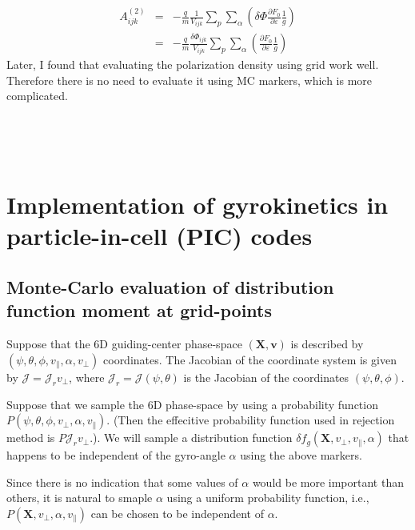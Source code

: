 \documentclass{article}
\begin{document}
\begin{eqnarray*}
  A_{i j k}^{(2)} & = & - \frac{q}{m} \frac{1}{V_{i j k}} \sum_p \sum_{\alpha}
  \left( \delta \Phi \frac{\partial F_0}{\partial \varepsilon} \frac{1}{g}
  \right)\\
  & = & - \frac{q}{m} \frac{\delta \Phi_{i j k}}{V_{i j k}} \sum_p
  \sum_{\alpha} \left( \frac{\partial F_0}{\partial \varepsilon} \frac{1}{g}
  \right)
\end{eqnarray*}
Later, I found that evaluating the polarization density using grid work well.
Therefore there is no need to evaluate it using MC markers, which is more
complicated.

\

\

\appendix\section{Implementation of gyrokinetics in particle-in-cell (PIC)
codes}

\subsection{Monte-Carlo evaluation of distribution function moment at
grid-points}

Suppose that the 6D guiding-center phase-space $(\mathbf{X}, \mathbf{v})$ is
described by $(\psi, \theta, \phi, v_{\parallel}, \alpha, v_{\perp})$
coordinates. The Jacobian of the coordinate system is given by $\mathcal{J} =
\mathcal{J}_r v_{\perp} \mathcal{}$, where $\mathcal{J}_r = \mathcal{J} (\psi,
\theta)$ is the Jacobian of the coordinates $(\psi, \theta, \phi)$.

Suppose that we sample the 6D phase-space by using a probability function $P
(\psi, \theta, \phi, v_{\perp}, \alpha, v_{\parallel})$. (Then the effecitive
probability function used in rejection method is $P \mathcal{J}_r
v_{\perp}$.). We will sample a distribution function $\delta f_g (\mathbf{X},
v_{\perp}, v_{\parallel}, \alpha)$ that happens to be independent of the
gyro-angle $\alpha$ using the above markers.

Since there is no indication that some values of $\alpha$ would be more
important than others, it is natural to smaple $\alpha$ using a uniform
probability function, i.e., $P (\mathbf{X}, v_{\perp}, \alpha, v_{\parallel})$
can be chosen to be independent of $\alpha$.
\end{document}
